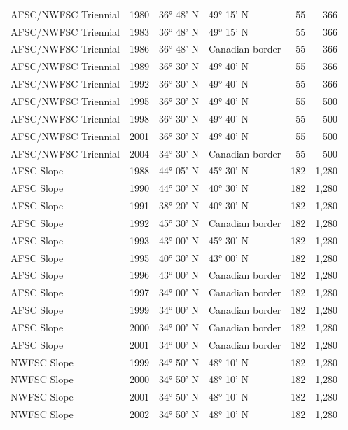 \documentclass[
  english,
]{article}
\begin{document}
\begin{longtable}{lrllrr}
AFSC/NWFSC Triennial & 1980 &  36° 48' N & 49° 15' N  & 55 & 366 \\ 
AFSC/NWFSC Triennial & 1983 &  36° 48' N & 49° 15' N  & 55 & 366 \\ 
AFSC/NWFSC Triennial & 1986 &  36° 48' N & Canadian border & 55 & 366 \\ 
AFSC/NWFSC Triennial & 1989 &  36° 30' N &  49° 40' N  & 55 & 366 \\ 
AFSC/NWFSC Triennial & 1992 &  36° 30' N &  49° 40' N  & 55 & 366 \\ 
AFSC/NWFSC Triennial & 1995 &  36° 30' N &  49° 40' N  & 55 & 500 \\ 
AFSC/NWFSC Triennial & 1998 &  36° 30' N &  49° 40' N  & 55 & 500 \\ 
AFSC/NWFSC Triennial & 2001 &  36° 30' N &  49° 40' N  & 55 & 500 \\ 
AFSC/NWFSC Triennial & 2004 & 34° 30' N & Canadian border & 55 & 500 \\ 
AFSC Slope & 1988 &  44° 05' N &  45° 30' N & 182 & 1,280 \\ 
AFSC Slope & 1990 &  44° 30' N & 40° 30' N & 182 & 1,280 \\ 
AFSC Slope & 1991 &  38° 20' N & 40° 30' N  & 182 & 1,280 \\ 
AFSC Slope & 1992 &  45° 30' N & Canadian border & 182 & 1,280 \\ 
AFSC Slope & 1993 &  43° 00' N & 45° 30' N & 182 & 1,280 \\ 
AFSC Slope & 1995 &  40° 30' N & 43° 00' N & 182 & 1,280 \\ 
AFSC Slope & 1996 &  43° 00' N & Canadian border & 182 & 1,280 \\ 
AFSC Slope & 1997 &  34° 00' N & Canadian border & 182 & 1,280 \\ 
AFSC Slope & 1999 &  34° 00' N & Canadian border & 182 & 1,280 \\ 
AFSC Slope & 2000 &  34° 00' N & Canadian border & 182 & 1,280 \\ 
AFSC Slope & 2001 &  34° 00' N & Canadian border & 182 & 1,280 \\ 
NWFSC Slope & 1999 &  34° 50' N & 48° 10' N & 182 & 1,280 \\ 
NWFSC Slope & 2000 &  34° 50' N & 48° 10' N & 182 & 1,280 \\ 
NWFSC Slope & 2001 &  34° 50' N & 48° 10' N & 182 & 1,280 \\ 
NWFSC Slope & 2002 &  34° 50' N & 48° 10' N & 182 & 1,280 \\ 
\bottomrule

\end{longtable}
\end{document}
